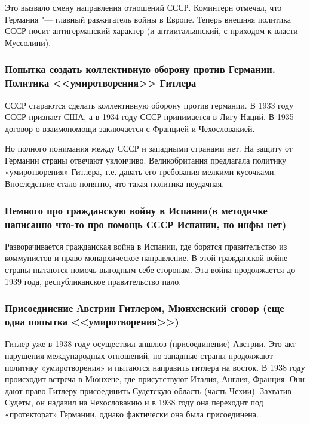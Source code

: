 Это вызвало смену направления отношений СССР. Коминтерн отмечал, что Германия "--- главный разжигатель войны в Европе. Теперь внешняя политика СССР носит антигерманский характер (и антиитальянский, с приходом к власти Муссолини). 

\subsubsection{\textbf{Попытка создать коллективную оборону против Германии. Политика <<умиротворения>> Гитлера}}

СССР стараются сделать коллективную оборону против германии. В 1933 году СССР признает США, а в 1934 году СССР принимается в Лигу Наций. В 1935 договор о взаимопомощи заключается с Францией и Чехословакией.

Но полного понимания между СССР и западными странами нет. На защиту от Германии страны отвечают уклончиво. Великобритания предлагала политику «умиротворения» Гитлера, т.е. давать его требования мелкими кусочками. Впоследствие стало понятно, что такая политика неудачная. 

\subsubsection{\textbf{Немного про гражданскую войну в Испании(в методичке написанно что-то про помощь СССР Испании, но инфы нет)}}

Разворачивается гражданская война в Испании, где борятся правительство из коммунистов и право-монархическое направление. В этой гражданской войне страны пытаются помочь выгодным себе сторонам. Эта война продолжается до 1939 года, республиканское правительство пало.

\subsubsection{\textbf{Присоединение Австрии Гитлером, Мюнхенский сговор (еще одна попытка <<умиротворения>>)}}

Гитлер уже в 1938 году осуществил аншлюз (присоединение) Австрии. Это акт нарушения международных отношений, но западные страны продолжают политику «умиротворения» и пытаются направить гитлера на восток. В 1938 году происходит встреча в Мюнхене, где присутствуют Италия, Англия, Франция. Они дают право Гитлеру присоединить Судетскую область (часть Чехии). Захватив Судеты, он надавил на Чехословакию и в 1938 году она переходит под «протекторат» Германии, однако фактически она была присоединена.

